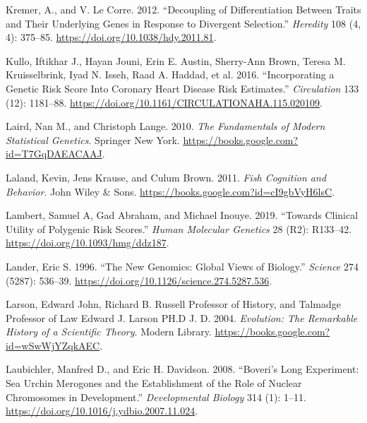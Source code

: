\documentclass[
]{book}
\newlength{\cslhangindent}
\newlength{\cslentryspacingunit} %
\newenvironment{CSLReferences}[2] %
 {%
  \setlength{\parindent}{0pt}
  \ifodd #1
  \let\oldpar\par
  \def\par{\hangindent=\cslhangindent\oldpar}
  \fi
  \setlength{\parskip}{#2\cslentryspacingunit}
 }%
 {}
\begin{document}
\begin{CSLReferences}{1}{0}
\leavevmode{}%
Kremer, A., and V. Le Corre. 2012. {``Decoupling of Differentiation Between Traits and Their Underlying Genes in Response to Divergent Selection.''} \emph{Heredity} 108 (4, 4): 375--85. \url{https://doi.org/10.1038/hdy.2011.81}.

\leavevmode{}%
Kullo, Iftikhar J., Hayan Jouni, Erin E. Austin, Sherry-Ann Brown, Teresa M. Kruisselbrink, Iyad N. Isseh, Raad A. Haddad, et al. 2016. {``Incorporating a {Genetic Risk Score Into Coronary Heart Disease Risk Estimates}.''} \emph{Circulation} 133 (12): 1181--88. \url{https://doi.org/10.1161/CIRCULATIONAHA.115.020109}.

\leavevmode{}%
Laird, Nan M., and Christoph Lange. 2010. \emph{The {Fundamentals} of {Modern Statistical Genetics}}. {Springer New York}. \url{https://books.google.com?id=T7GqDAEACAAJ}.

\leavevmode{}%
Laland, Kevin, Jens Krause, and Culum Brown. 2011. \emph{Fish {Cognition} and {Behavior}}. {John Wiley \& Sons}. \url{https://books.google.com?id=cI9gbVyH6lsC}.

\leavevmode{}%
Lambert, Samuel A, Gad Abraham, and Michael Inouye. 2019. {``Towards Clinical Utility of Polygenic Risk Scores.''} \emph{Human Molecular Genetics} 28 (R2): R133--42. \url{https://doi.org/10.1093/hmg/ddz187}.

\leavevmode{}%
Lander, Eric S. 1996. {``The {New Genomics}: {Global Views} of {Biology}.''} \emph{Science} 274 (5287): 536--39. \url{https://doi.org/10.1126/science.274.5287.536}.

\leavevmode{}%
Larson, Edward John, Richard B. Russell Professor of History, and Talmadge Professor of Law Edward J. Larson PH.D J. D. 2004. \emph{Evolution: {The Remarkable History} of a {Scientific Theory}}. {Modern Library}. \url{https://books.google.com?id=wSwWjYZqkAEC}.

\leavevmode{}%
Laubichler, Manfred D., and Eric H. Davidson. 2008. {``Boveri's Long Experiment: {Sea} Urchin Merogones and the Establishment of the Role of Nuclear Chromosomes in Development.''} \emph{Developmental Biology} 314 (1): 1--11. \url{https://doi.org/10.1016/j.ydbio.2007.11.024}.


\end{CSLReferences}
\end{document}
